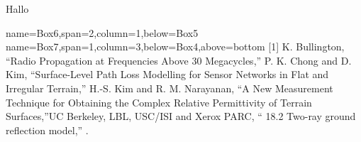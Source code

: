 \documentclass[a0paper,landscape]{baposter}
\begin{document}
\begin{poster}
{\begin{minipage}{.5\textwidth}
\centering
Hallo
\end{minipage}%
\begin{minipage}{0.5\textwidth}
\centering

\label{ourModel1}
\end{minipage}

}

{name=Box6,span=2,column=1,below=Box5}{
}
{name=Box7,span=1,column=3,below=Box4,above=bottom}{
[1] K. Bullington, “Radio Propagation at Frequencies Above 30 Megacycles,” \newline
[2] P. K. Chong and D. Kim, “Surface-Level Path Loss Modelling for Sensor Networks in Flat and Irregular Terrain,” \newline
[3] H.-S. Kim and R. M. Narayanan, “A New Measurement Technique for Obtaining the Complex Relative Permittivity of Terrain Surfaces,”\newline
[4] UC Berkeley, LBL, USC/ISI and Xerox PARC, “ 18.2 Two-ray ground reflection model,” .
}



\end{poster}
\end{document}
